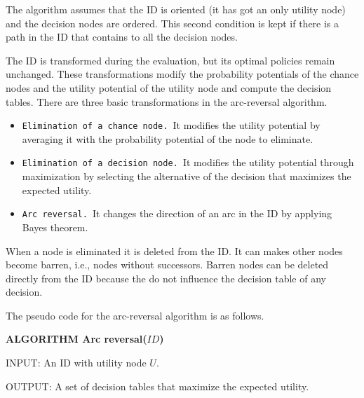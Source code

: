 The algorithm assumes that the ID is oriented (it has got an only utility
node) and the decision nodes are ordered. This second condition is kept if
there is a path in the ID that contains to all the decision nodes.

The ID is transformed during the evaluation, but its optimal policies remain
unchanged. These transformations modify the probability potentials of the
chance nodes and the utility potential of the utility node and compute the
decision tables. There are three basic transformations in the arc-reversal
algorithm.

\begin{itemize}
\item \texttt{Elimination of a chance node. }It modifies the utility
potential by averaging it with the probability potential of the node to
eliminate.

\item \texttt{Elimination of a decision node. }It modifies the utility
potential through maximization by selecting the alternative of the decision
that maximizes the expected utility.

\item \texttt{Arc reversal. }It changes the direction of an arc in the ID by
applying Bayes theorem.
\end{itemize}

When a node is eliminated it is deleted from the ID. It can makes other
nodes become barren, i.e., nodes without successors. Barren nodes can be
deleted directly from the ID because the do not influence the decision table
of any decision.

The pseudo code for the arc-reversal algorithm is as follows.

\noindent \textsf{\textbf{ALGORITHM Arc reversal($ID$)}}

\bigskip \noindent INPUT: An ID with utility node $U$.

\noindent OUTPUT: A set of decision tables that maximize the expected
utility.

